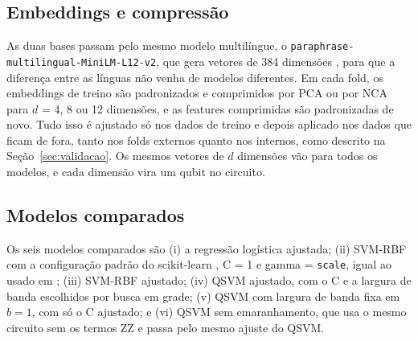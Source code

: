 \documentclass[conference]{IEEEtran}
\newcommand{\svm}{\mbox{SVM-RBF}}
\begin{document}
\subsection{Embeddings e compressão}
As duas bases passam pelo mesmo modelo multilíngue, o \texttt{paraphrase-\allowbreak multilingual-\allowbreak MiniLM-\allowbreak L12-\allowbreak v2}, que gera vetores de 384 dimensões \cite{reimers2020}, para que a diferença entre as línguas não venha de modelos diferentes. Em cada fold, os embeddings de treino são padronizados e comprimidos por PCA ou por NCA para $d$ = 4, 8 ou 12 dimensões, e as features comprimidas são padronizadas de novo. Tudo isso é ajustado só nos dados de treino e depois aplicado nos dados que ficam de fora, tanto nos folds externos quanto nos internos, como descrito na Seção~\ref{sec:validacao}. Os mesmos vetores de $d$ dimensões vão para todos os modelos, e cada dimensão vira um qubit no circuito.

\subsection{Modelos comparados}
Os seis modelos comparados são (i) a regressão logística ajustada; (ii) \svm{} com a configuração padrão do scikit-learn \cite{pedregosa2011}, C = 1 e gamma = \texttt{scale}, igual ao usado em \cite{cajas2025}; (iii) \svm{} ajustado; (iv) QSVM ajustado, com o C e a largura de banda escolhidos por busca em grade; (v) QSVM com largura de banda fixa em $b = 1$, com só o C ajustado; e (vi) QSVM sem emaranhamento, que usa o mesmo circuito sem os termos ZZ e passa pelo mesmo ajuste do QSVM.
\end{document}
